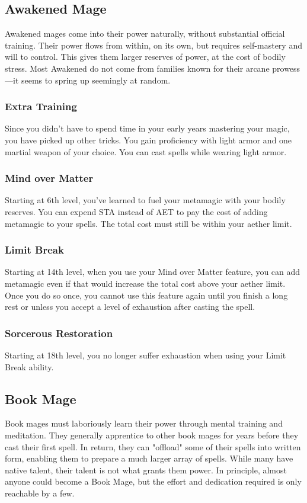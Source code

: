 \subsection{Awakened Mage}
Awakened mages come into their power naturally, without substantial official training. Their power flows from within, on its own, but requires self-mastery and will to control. This gives them larger reserves of power, at the cost of bodily stress. Most Awakened do not come from families known for their arcane prowess---it seems to spring up seemingly at random.

\subsubsection{Extra Training}
Since you didn't have to spend time in your early years mastering your magic, you have picked up other tricks. You gain proficiency with light armor and one martial weapon of your choice. You can cast spells while wearing light armor.

\subsubsection{Mind over Matter}
Starting at 6th level, you've learned to fuel your metamagic with your bodily reserves. You can expend STA instead of AET to pay the cost of adding metamagic to your spells. The total cost must still be within your aether limit.

\subsubsection{Limit Break}
Starting at 14th level, when you use your Mind over Matter feature, you can add metamagic even if that would increase the total cost above your aether limit. Once you do so once, you cannot use this feature again until you finish a long rest or unless you accept a level of exhaustion after casting the spell.

\subsubsection{Sorcerous Restoration}
Starting at 18th level, you no longer suffer exhaustion when using your Limit Break ability.

\subsection{Book Mage}
Book mages must laboriously learn their power through mental training and meditation. They generally apprentice to other book mages for years before they cast their first spell. In return, they can "offload" some of their spells into written form, enabling them to prepare a much larger array of spells. While many have native talent, their talent is not what grants them power. In principle, almost anyone could become a Book Mage, but the effort and dedication required is only reachable by a few.

